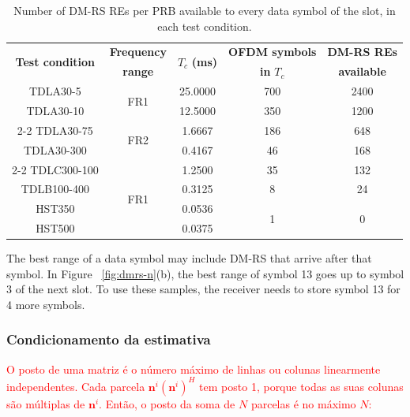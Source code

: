 \begin{table}[htbp]
\caption{Number of DM-RS REs per PRB available to every data symbol of the slot, in each test condition.}
\label{tab:n-maximo}
\vspace{4pt} %
\centering
\footnotesize
\renewcommand{\arraystretch}{1.2}
\setlength{\aboverulesep}{0pt}
\setlength{\belowrulesep}{0pt}
\begin{tabular}{|c|c|c|c|c|}
\toprule
\multirow{2}{*}{\textbf{Test condition}} & \textbf{Frequency} & \multirow{2}{*}{{\boldmath $T_c$} \textbf{(ms)}} & \textbf{OFDM symbols} & \textbf{DM-RS REs} \\
 & \textbf{range} & & \textbf{in} {\boldmath $T_c$} & \textbf{available} \\
\midrule
TDLA30-5    & \multirow{2}{*}{FR1} & 25.0000 & 700 & 2400 \\
TDLA30-10   &                      & 12.5000 & 350 & 1200 \\
\cline{2-2}
TDLA30-75   & \multirow{2}{*}{FR2} & 1.6667  & 186 & 648 \\
TDLA30-300  &                      & 0.4167  & 46  & 168 \\
\cline{2-2}
TDLC300-100 & \multirow{4}{*}{FR1} & 1.2500  & 35  & 132 \\
TDLB100-400 &                      & 0.3125  & 8   & 24 \\
HST350      &                      & 0.0536  & \multirow{2}{*}{1} & \multirow{2}{*}{0} \\
HST500      &                      & 0.0375  &     &  \\
\bottomrule
\end{tabular}
\vspace{4pt}
\end{table}

The best range of a data symbol may include DM-RS that arrive after that symbol. In Figure ~\ref{fig:dmrs-n}(b), the best range of symbol 13 goes up to symbol 3 of the next slot. To use these samples, the receiver needs to store symbol 13 for 4 more symbols.



\subsubsection{Condicionamento da estimativa}\label{subsubsec:condicionamento-R}
\textcolor{red}{O posto de uma matriz é o número máximo de linhas ou colunas linearmente independentes. Cada parcela $\mathbf{n}^i(\mathbf{n}^i)^H$ tem posto 1, porque todas as suas colunas são múltiplas de $\mathbf{n}^i$. Então, o posto da soma de $N$ parcelas é no máximo $N$:}

